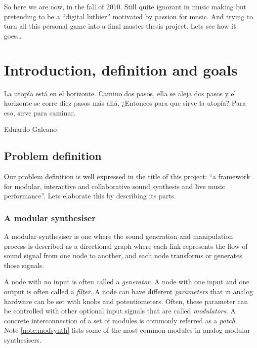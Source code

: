 So here we are now, in the fall of 2010. Still quite ignorant in music
making but pretending to be a ``digital luthier'' motivated by passion
for music. And trying to turn all this personal game into a final
master thesis project. Lets see how it goes\ldots

\chapter{Introduction, definition and goals}

\epigraph{La utopía está en el horizonte. Camino dos pasos, ella se
  aleja dos pasos y el horizonte se corre diez pasos más
  allá. ¿Entonces para que sirve la utopía? Para eso, sirve para
  caminar.}{Eduardo Galeano}

\section{Problem definition}

Our problem definition is well expressed in the title of this project:
``a framework for modular, interactive and collaborative sound
synthesis and live music performance''. Lets elaborate this by
describing its parts.

\subsection{A modular synthesiser}
\label{sec:defmodular}
A modular synthesiser is one where the sound generation and
manipulation process is described as a directional graph where each
link represents the flow of sound signal from one node to another, and
each node transforms or generates those signals.

A node with no input is often called a \emph{generator}. A node with
one input and one output is often called a \emph{filter}. A node can
have different \emph{parameters} that in analog hardware can be set
with knobs and potentiometers. Often, these parameter can be
controlled with other optional input signals that are called
\emph{modulators}. A concrete interconnection of a set of modules is
commonly referred as a \emph{patch}. Note \ref{note:modsynth} lists
some of the most common modules in analog modular synthesisers.

